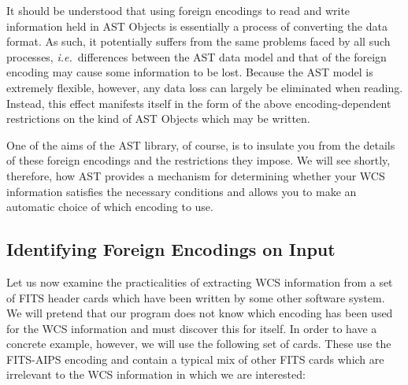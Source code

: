 \documentclass[twoside,11pt]{article}
\begin{document}
It should be understood that using foreign encodings to read and write
information held in AST Objects is essentially a process of converting
the data format. As such, it potentially suffers from the same
problems faced by all such processes, {\em{i.e.}}\ differences between
the AST data model and that of the foreign encoding may cause some
information to be lost.  Because the AST model is extremely flexible,
however, any data loss can largely be eliminated when reading.
Instead, this effect manifests itself in the form of the above
encoding-dependent restrictions on the kind of AST Objects which may
be written.

One of the aims of the AST library, of course, is to insulate you from
the details of these foreign encodings and the restrictions they
impose. We will see shortly, therefore, how AST provides a mechanism
for determining whether your WCS information satisfies the necessary
conditions and allows you to make an automatic choice of which
encoding to use.

\subsection{\label{ss:identifyingfitsencoding}Identifying Foreign Encodings on Input}

Let us now examine the practicalities of extracting WCS information
from a set of FITS header cards which have been written by some other
software system. We will pretend that our program does not know which
encoding has been used for the WCS information and must discover this
for itself. In order to have a concrete example, however, we will use
the following set of cards. These use the FITS-AIPS encoding and
contain a typical mix of other FITS cards which are irrelevant to the
WCS information in which we are interested:
\end{document}
